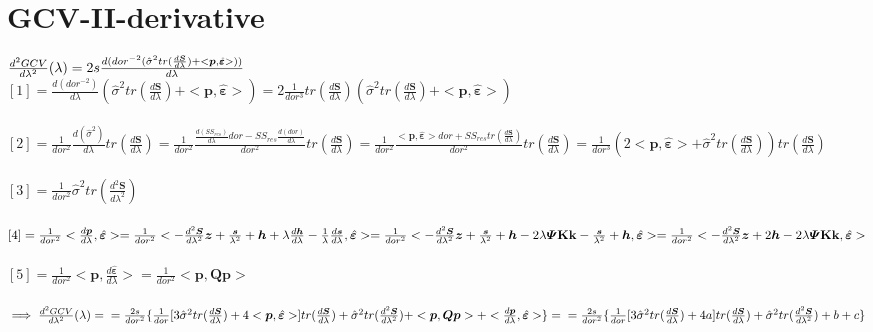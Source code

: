 \documentclass[11pt,twoside]{report}
\begin{document}
\section{GCV-II-derivative}
$ \frac{d^2GCV}{d\lambda^2}(\lambda) = 2s\frac{d({dor}^{-2}(\hat{\sigma}^2tr(\frac{d\mathbold{S}}{d\lambda}) + <\mathbold{p}, \hat{\mathbold{\varepsilon}}>))}{d\lambda}\\$
\\
$ [1] = \frac{d(dor^{-2})}{d\lambda}(\hat{\sigma}^2tr(\frac{d\mathbold{S}}{d\lambda}) + <\boldsymbol{p}, \hat{\mathbold{\varepsilon}}>) =  2\frac{1}{dor^3}tr(\frac{d\mathbold{S}}{d\lambda})(\hat{\sigma}^2tr(\frac{d\mathbold{S}}{d\lambda}) + <\boldsymbol{p}, \hat{\mathbold{\varepsilon}}>)$\\
\\
$ [2] = \frac{1}{dor^2}\frac{d(\hat{\sigma}^2)}{d\lambda}tr(\frac{d\mathbold{S}}{d\lambda}) = \frac{1}{dor^2}\frac{\frac{d(SS_{res})}{d\lambda}dor - SS_{res}\frac{d(dor)}{d\lambda}}{dor^2}tr(\frac{d\mathbold{S}}{d\lambda}) = \frac{1}{dor^2}\frac{<\mathbold{p}, \hat{\mathbold{\varepsilon}}>dor + SS_{res}tr(\frac{d\mathbold{S}}{d\lambda})}{dor^2}tr(\frac{d\mathbold{S}}{d\lambda}) = \frac{1}{dor^3}(2<\mathbold{p}, \hat{\mathbold{\varepsilon}}> + \hat{\sigma}^2tr(\frac{d\mathbold{S}}{d\lambda}))tr(\frac{d\mathbold{S}}{d\lambda})$\\
\\
$ [3] =  \frac{1}{dor^2}\hat{\sigma}^2tr(\frac{d^2\mathbold{S}}{d\lambda^2})$\\
\\
$ [4] = \frac{1}{dor^2}<\frac{d\mathbold{p}}{d\lambda}, \hat{\mathbold{\varepsilon}}> =  \frac{1}{dor^2}<-\frac{d^2\mathbold{S}}{d\lambda^2}\mathbold{z} + \frac{\boldsymbol{s}}{\lambda^2} + \boldsymbol{h} + \lambda \frac{d\boldsymbol{h}}{d\lambda} - \frac{1}{\lambda}\frac{d\boldsymbol{s}}{d\lambda}, \hat{\mathbold{\varepsilon}}> =\\ \frac{1}{dor^2}<-\frac{d^2\mathbold{S}}{d\lambda^2}\mathbold{z} + \frac{\boldsymbol{s}}{\lambda^2} + \boldsymbol{h} -2\lambda\boldsymbol{\Psi} \textbf{K} \textbf{k} -\frac{\boldsymbol{s}}{\lambda^2} + \boldsymbol{h}, \hat{\mathbold{\varepsilon}}> = \frac{1}{dor^2}<-\frac{d^2\mathbold{S}}{d\lambda^2}\mathbold{z}  + 2\boldsymbol{h} -2\lambda\boldsymbol{\Psi} \textbf{K} \textbf{k}, \hat{\mathbold{\varepsilon}}> $\\
\\
$ [5] =  \frac{1}{dor^2}<\mathbold{p}, \frac{d\hat{\mathbold{\varepsilon}}}{d\lambda}> = \frac{1}{dor^2}<\mathbold{p},\mathbold{Q}\mathbold{p}>$\\
\\
$\implies  \frac{d^2GCV}{d\lambda^2}(\lambda) =
\\ =\frac{2s}{dor^2}\{\frac{1}{dor}[3\hat{\sigma}^2tr(\frac{d\mathbold{S}}{d\lambda}) + 4<\mathbold{p}, \hat{\mathbold{\varepsilon}}>]tr(\frac{d\mathbold{S}}{d\lambda}) + \hat{\sigma}^2tr(\frac{d^2\mathbold{S}}{d\lambda^2}) + <\mathbold{p},\mathbold{Q} \mathbold{p}> + <\frac{d\mathbold{p}}{d\lambda}, \hat{\mathbold{\varepsilon}}>\} = \\
=\frac{2s}{dor^2}\{\frac{1}{dor}[3\hat{\sigma}^2tr(\frac{d\mathbold{S}}{d\lambda}) + 4a]tr(\frac{d\mathbold{S}}{d\lambda}) + \hat{\sigma}^2tr(\frac{d^2\mathbold{S}}{d\lambda^2}) +b+c\}$
\end{document}
